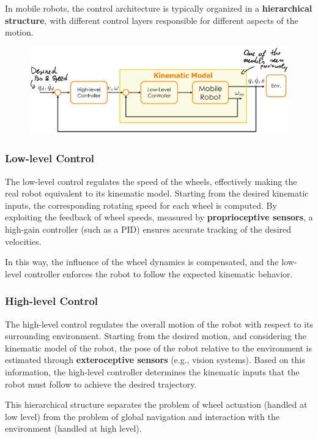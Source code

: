 In mobile robots, the control architecture is typically organized in a \textbf{hierarchical structure}, with different control layers responsible for different aspects of the motion.

\begin{figure}[H]
    \centering
    \includegraphics[width=1\linewidth]{control_mobile_robots.png}
\end{figure}

\subsubsection*{Low-level Control}
The low-level control regulates the speed of the wheels, effectively making the real robot equivalent to its kinematic model.  
Starting from the desired kinematic inputs, the corresponding rotating speed for each wheel is computed. By exploiting the feedback of wheel speeds, measured by \textbf{proprioceptive sensors}, a high-gain controller (such as a PID) ensures accurate tracking of the desired velocities.  

In this way, the influence of the wheel dynamics is compensated, and the low-level controller enforces the robot to follow the expected kinematic behavior.

\subsubsection*{High-level Control}
The high-level control regulates the overall motion of the robot with respect to its surrounding environment.  
Starting from the desired motion, and considering the kinematic model of the robot, the pose of the robot relative to the environment is estimated through \textbf{exteroceptive sensors} (e.g., vision systems). Based on this information, the high-level controller determines the kinematic inputs that the robot must follow to achieve the desired trajectory.  

This hierarchical structure separates the problem of wheel actuation (handled at low level) from the problem of global navigation and interaction with the environment (handled at high level).


